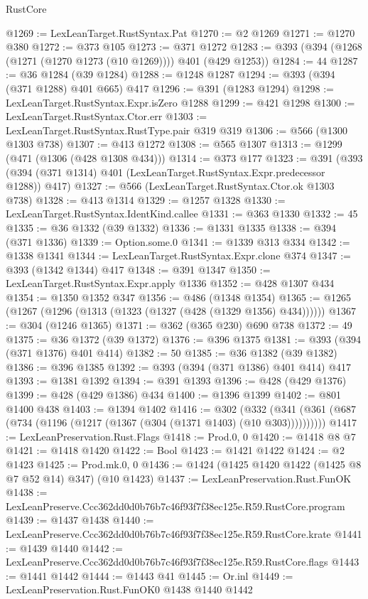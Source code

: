 \begin{lexlean}{RustCore}
\begin{coremodule}
@1269 := LexLeanTarget.RustSyntax.Pat
@1270 := @2 @1269
@1271 := @1270 @380
@1272 := @373 @105
@1273 := @371 @1272
@1283 := @393 (@394 (@1268 (@1271 (@1270 @1273 (@10 @1269)))) @401 (@429 @1253))
@1284 := 44
@1287 := @36 @1284 (@39 @1284)
@1288 := @1248 @1287
@1294 := @393 (@394 (@371 @1288) @401 @665) @417
@1296 := @391 (@1283 @1294)
@1298 := LexLeanTarget.RustSyntax.Expr.isZero @1288
@1299 := @421 @1298
@1300 := LexLeanTarget.RustSyntax.Ctor.err
@1303 := LexLeanTarget.RustSyntax.RustType.pair @319 @319
@1306 := @566 (@1300 @1303 @738)
@1307 := @413 @1272
@1308 := @565 @1307
@1313 := @1299 (@471 (@1306 (@428 @1308 @434)))
@1314 := @373 @177
@1323 := @391 (@393 (@394 (@371 @1314) @401 (LexLeanTarget.RustSyntax.Expr.predecessor @1288)) @417)
@1327 := @566 (LexLeanTarget.RustSyntax.Ctor.ok @1303 @738)
@1328 := @413 @1314
@1329 := @1257 @1328
@1330 := LexLeanTarget.RustSyntax.IdentKind.callee
@1331 := @363 @1330
@1332 := 45
@1335 := @36 @1332 (@39 @1332)
@1336 := @1331 @1335
@1338 := @394 (@371 @1336)
@1339 := Option.some.{0}
@1341 := @1339 @313 @334
@1342 := @1338 @1341
@1344 := LexLeanTarget.RustSyntax.Expr.clone @374
@1347 := @393 (@1342 @1344) @417
@1348 := @391 @1347
@1350 := LexLeanTarget.RustSyntax.Expr.apply @1336
@1352 := @428 @1307 @434
@1354 := @1350 @1352 @347
@1356 := @486 (@1348 @1354)
@1365 := @1265 (@1267 (@1296 (@1313 (@1323 (@1327 (@428 (@1329 @1356) @434))))))
@1367 := @304 (@1246 @1365)
@1371 := @362 (@365 @230) @690 @738
@1372 := 49
@1375 := @36 @1372 (@39 @1372)
@1376 := @396 @1375
@1381 := @393 (@394 (@371 @1376) @401 @414)
@1382 := 50
@1385 := @36 @1382 (@39 @1382)
@1386 := @396 @1385
@1392 := @393 (@394 (@371 @1386) @401 @414) @417
@1393 := @1381 @1392
@1394 := @391 @1393
@1396 := @428 (@429 @1376)
@1399 := @428 (@429 @1386) @434
@1400 := @1396 @1399
@1402 := @801 @1400 @438
@1403 := @1394 @1402
@1416 := @302
    (@332 (@341 (@361 (@687 (@734 (@1196 (@1217 (@1367 (@304 (@1371 @1403) (@10 @303))))))))))
@1417 := LexLeanPreservation.Rust.Flags
@1418 := Prod.{0, 0}
@1420 := @1418 @8 @7
@1421 := @1418 @1420
@1422 := Bool
@1423 := @1421 @1422
@1424 := @2 @1423
@1425 := Prod.mk.{0, 0}
@1436 := @1424 (@1425 @1420 @1422 (@1425 @8 @7 @52 @14) @347) (@10 @1423)
@1437 := LexLeanPreservation.Rust.FunOK
@1438 := LexLeanPreserve.Ccc362dd0d0b76b7c46f93f7f38ec125e.R59.RustCore.program
@1439 := @1437 @1438
@1440 := LexLeanPreserve.Ccc362dd0d0b76b7c46f93f7f38ec125e.R59.RustCore.krate
@1441 := @1439 @1440
@1442 := LexLeanPreserve.Ccc362dd0d0b76b7c46f93f7f38ec125e.R59.RustCore.flags
@1443 := @1441 @1442
@1444 := @1443 @41
@1445 := Or.inl
@1449 := LexLeanPreservation.Rust.FunOK0 @1438 @1440 @1442

\end{coremodule}
\end{lexlean}
